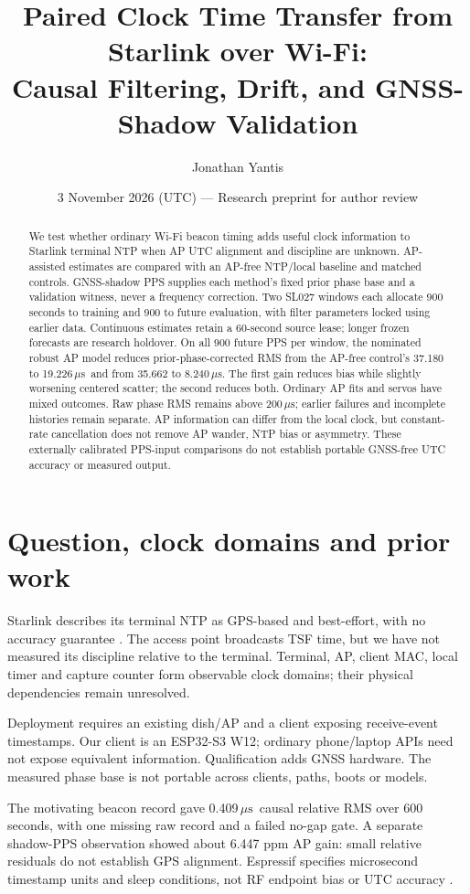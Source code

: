 \documentclass[10pt,letterpaper]{article}
\title{Paired Clock Time Transfer from Starlink over Wi-Fi:\\Causal Filtering, Drift, and GNSS-Shadow Validation}
\author{Jonathan Yantis}
\date{3 November 2026 (UTC) --- Research preprint for author review}
\newcommand{\us}{\ensuremath{\,\mu\mathrm{s}}}
\begin{document}
\maketitle\thispagestyle{fancy}
\begin{abstract}
We test whether ordinary Wi-Fi beacon timing adds useful clock information to
Starlink terminal NTP when AP UTC alignment and discipline are unknown.
AP-assisted estimates are compared with an AP-free NTP/local baseline and
matched controls. GNSS-shadow PPS supplies each method's fixed prior phase
base and a validation witness, never a frequency correction. Two SL027 windows
each allocate 900 seconds to training and 900 to future evaluation, with filter
parameters locked using earlier data. Continuous estimates retain a 60-second
source lease; longer frozen forecasts are research holdover.
On all 900 future PPS per window, the nominated robust AP model reduces
prior-phase-corrected RMS from the AP-free control's 37.180 to 19.226\us\ and
from 35.662 to 8.240\us. The first gain reduces bias while slightly worsening
centered scatter; the second reduces both. Ordinary AP fits and servos have
mixed outcomes. Raw phase RMS remains above 200\us; earlier failures and
incomplete histories remain separate. AP information can differ from the local
clock, but constant-rate cancellation does not remove AP wander, NTP bias or
asymmetry. These externally calibrated PPS-input comparisons do not establish
portable GNSS-free UTC accuracy or measured output.
\end{abstract}

\section{Question, clock domains and prior work}
Starlink describes its terminal NTP as GPS-based and best-effort, with no
accuracy guarantee \citep{starlink}. The access point broadcasts TSF time,
but we have not measured its discipline relative to the terminal.
Terminal, AP, client MAC, local timer and capture counter form observable
clock domains; their physical dependencies remain unresolved.

Deployment requires an existing dish/AP and a client exposing receive-event
timestamps. Our client is an ESP32-S3 W12; ordinary phone/laptop APIs need not
expose equivalent information. Qualification adds GNSS hardware. The measured
phase base is not portable across clients, paths, boots or models.

The motivating beacon record gave 0.409\us\ causal relative RMS over 600 seconds,
with one missing raw record and a failed no-gap gate. A separate shadow-PPS
observation showed about 6.447 ppm AP gain: small relative residuals do not
establish GPS alignment. Espressif specifies microsecond timestamp units and
sleep conditions, not RF endpoint bias or UTC accuracy \citep{espheader}.
\end{document}
